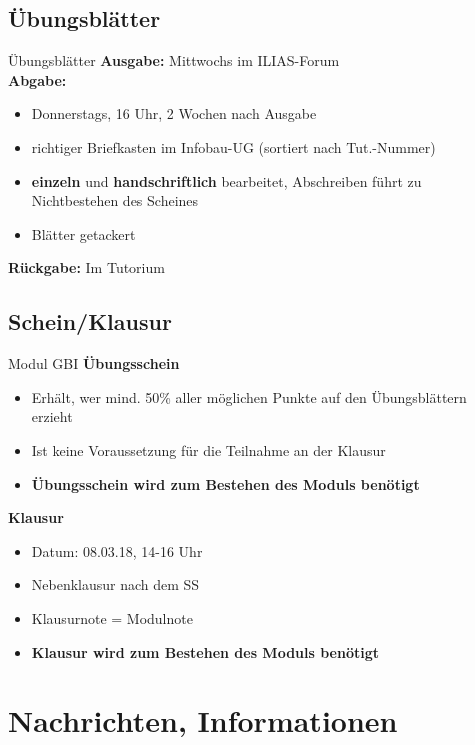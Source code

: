 	
\subsection{Übungsblätter}
	\begin{frame}{Übungsblätter}
		\textbf{Ausgabe:} Mittwochs im ILIAS-Forum \\
		\pause
		\textbf{Abgabe:}
			\begin{itemize}
				\item Donnerstags, 16 Uhr, 2 Wochen nach Ausgabe
				\item richtiger Briefkasten im Infobau-UG (sortiert nach Tut.-Nummer)
				\pause
				\item \textbf{einzeln} und \textbf{handschriftlich} bearbeitet, Abschreiben führt zu Nichtbestehen des Scheines
				\item Blätter getackert
			\end{itemize}
		\pause	
		\textbf{Rückgabe:} Im Tutorium
	\end{frame}
\subsection{Schein/Klausur}
 \begin{frame}{Modul GBI}
		\textbf{Übungsschein}
			\begin{itemize}
				\item Erhält, wer mind. 50\% aller möglichen Punkte auf den Übungsblättern erzieht
				\item Ist keine Voraussetzung für die Teilnahme an der Klausur
				\item \textbf{Übungsschein wird zum Bestehen des Moduls benötigt} 
			\end{itemize}
		\pause	
		\textbf{Klausur}
		\begin{itemize}
				\item Datum: 08.03.18, 14-16 Uhr
				\item Nebenklausur nach dem SS
				\item Klausurnote = Modulnote
				\item \textbf{Klausur wird zum Bestehen des Moduls benötigt} 
			\end{itemize}
	\end{frame}
	

\section[Nachrichten]{Nachrichten, Informationen}
